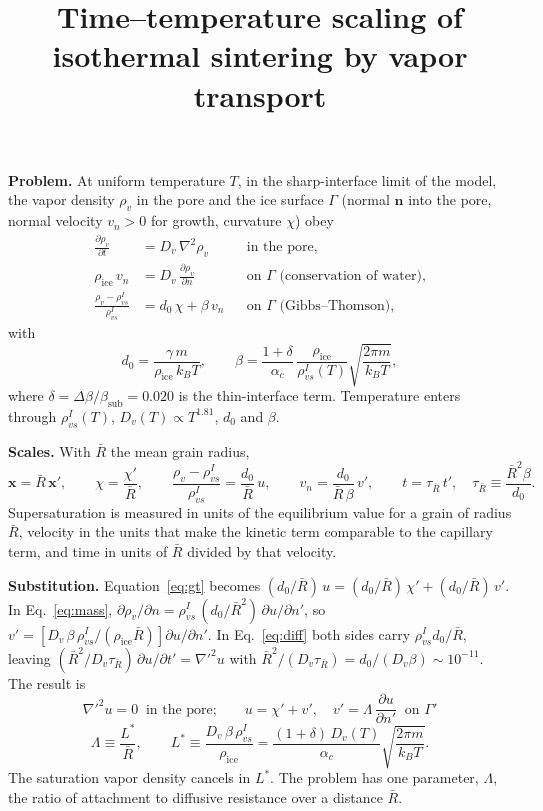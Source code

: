 \documentclass[11pt]{article}
\title{\vspace{-3em}Time--temperature scaling of isothermal sintering by vapor transport\vspace{-0.5em}}
\author{}\date{\vspace{-3.5em}}
\newcommand{\ice}{\mathrm{ice}}
\newcommand{\Rbar}{\bar R}
\newcommand{\rvs}{\rho_{vs}^{I}}
\newcommand{\pd}[2]{\frac{\partial #1}{\partial #2}}
\begin{document}
\maketitle

\textbf{Problem.} At uniform temperature $T$, in the sharp-interface limit of
the model, the vapor density $\rho_v$ in the pore and the ice surface
$\Gamma$ (normal $\mathbf n$ into the pore, normal velocity $v_n > 0$ for
growth, curvature $\chi$) obey
\begin{align}
\pd{\rho_v}{t} &= D_v\,\nabla^{2}\rho_v && \text{in the pore,} \label{eq:diff}\\
\rho_\ice\,v_n &= D_v\,\pd{\rho_v}{n} && \text{on } \Gamma \text{ (conservation of water),} \label{eq:mass}\\
\frac{\rho_v - \rvs}{\rvs} &= d_0\,\chi + \beta\,v_n && \text{on } \Gamma \text{ (Gibbs--Thomson),} \label{eq:gt}
\end{align}
with
\begin{equation}
d_0 = \frac{\gamma\,m}{\rho_\ice\,k_B T},\qquad
\beta = \frac{1+\delta}{\alpha_c}\,\frac{\rho_\ice}{\rvs(T)}\sqrt{\frac{2\pi m}{k_B T}} ,
\label{eq:coef}
\end{equation}
where $\delta = \Delta\beta/\beta_{\mathrm{sub}} = 0.020$ is the
thin-interface term. Temperature enters through $\rvs(T)$, $D_v(T) \propto
T^{1.81}$, $d_0$ and $\beta$.

\textbf{Scales.} With $\Rbar$ the mean grain radius,
\begin{equation}
\mathbf x = \Rbar\,\mathbf x',\qquad
\chi = \frac{\chi'}{\Rbar},\qquad
\frac{\rho_v - \rvs}{\rvs} = \frac{d_0}{\Rbar}\,u,\qquad
v_n = \frac{d_0}{\Rbar\,\beta}\,v',\qquad
t = \tau_{\Rbar}\,t',\quad \tau_{\Rbar} \equiv \frac{\Rbar^{2}\beta}{d_0} .
\label{eq:scales}
\end{equation}
Supersaturation is measured in units of the equilibrium value for a grain of
radius $\Rbar$, velocity in the units that make the kinetic term comparable
to the capillary term, and time in units of $\Rbar$ divided by that velocity.

\textbf{Substitution.} Equation~\eqref{eq:gt} becomes $(d_0/\Rbar)\,u =
(d_0/\Rbar)\,\chi' + (d_0/\Rbar)\,v'$. In Eq.~\eqref{eq:mass},
$\partial\rho_v/\partial n = \rvs\,(d_0/\Rbar^{2})\,\partial u/\partial n'$,
so $v' = \left[D_v\,\beta\,\rvs/(\rho_\ice\Rbar)\right]\partial u/\partial n'$.
In Eq.~\eqref{eq:diff} both sides carry $\rvs d_0/\Rbar$, leaving
$(\Rbar^{2}/D_v\tau_{\Rbar})\,\partial u/\partial t' = \nabla'^{2}u$ with
$\Rbar^{2}/(D_v\tau_{\Rbar}) = d_0/(D_v\beta) \sim 10^{-11}$. The result is
\begin{equation}
\boxed{\;\nabla'^{2}u = 0 \ \text{ in the pore;}\qquad
u = \chi' + v',\quad v' = \Lambda\,\pd{u}{n'} \ \text{ on } \Gamma'\;}
\label{eq:reduced}
\end{equation}
\begin{equation}
\Lambda \equiv \frac{L^{*}}{\Rbar},\qquad
L^{*} \equiv \frac{D_v\,\beta\,\rvs}{\rho_\ice} = \frac{(1+\delta)\,D_v(T)}{\alpha_c}\sqrt{\frac{2\pi m}{k_B T}} .
\label{eq:Lstar}
\end{equation}
The saturation vapor density cancels in $L^{*}$. The problem has one
parameter, $\Lambda$, the ratio of attachment to diffusive resistance over a
distance $\Rbar$.
\end{document}
